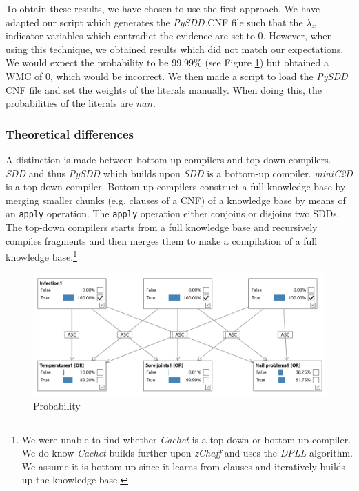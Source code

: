 \documentclass{article}
\begin{document}
To obtain these results, we have chosen to use the first approach. We have adapted our script which generates the \textit{PySDD} CNF file such that the $\lambda_x$ indicator variables which contradict the evidence are set to 0. However, when using this technique, we obtained results which did not match our expectations. We would expect the probability to be $99.99\%$ (see Figure \ref{fig:task_1_3_4}) but obtained a WMC of 0, which would be incorrect. We then made a script to load the \textit{PySDD} CNF file and set the weights of the literals manually. When doing this, the probabilities of the literals are $nan$.

\subsubsection{Theoretical differences}
A distinction is made between bottom-up compilers and top-down compilers. \textit{SDD} and thus \textit{PySDD} which builds upon \textit{SDD} is a bottom-up compiler. \textit{miniC2D} is a top-down compiler. Bottom-up compilers construct a full knowledge base by merging smaller chunks (e.g. clauses of a CNF) of a knowledge base by means of an \texttt{apply} operation.\cite{topdown} The \texttt{apply} operation either conjoins or disjoins two SDDs. \cite{bottomup} The top-down compilers starts from a full knowledge base and recursively compiles fragments and then merges them to make a compilation of a full knowledge base.\cite{topdown}\footnote{We were unable to find whether \textit{Cachet} is a top-down or bottom-up compiler. We do know \textit{Cachet} builds further upon \textit{zChaff} and uses the \textit{DPLL} algorithm. We assume it is bottom-up since it learns from clauses and iteratively builds up the knowledge base.}

\newpage

\begin{figure}[h]
	\centering
	\includegraphics[width=\linewidth]{images/task_1_3_4.png}
	\caption{Probability}
	\label{fig:task_1_3_4}
\end{figure}
\end{document}
